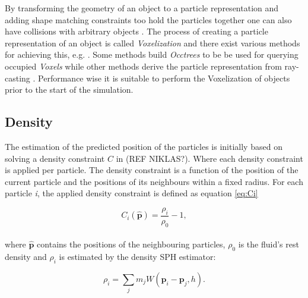By transforming the geometry of an object to a particle representation and adding shape matching constraints too hold the particles together one can also have collisions with arbitrary objects \cite{muller2005meshless, macklin2014unified}. The process of creating a particle representation of an object is called \textit{Voxelization} and there exist various methods for achieving this, e.g. \cite{VoxPolygon, VoxSingle}. Some methods build \textit{Occtrees} to be be used for querying occupied \textit{Voxels} while other methods derive the particle representation from ray-casting \cite{VoxSingle}. Performance wise it is suitable to perform the Voxelization of objects prior to the start of the simulation.


\subsection{Density}

The estimation of the predicted position of the particles is initially based on solving a density constraint $C$ in (REF NIKLAS?). Where each density constraint is applied per particle. The density constraint is a function of the position of the current particle and the positions of its neighbours within a fixed radius. For each particle \textit{i}, the applied density constraint is defined as equation \ref{eq:Ci}

\begin{equation}
\label{eq:Ci}
C_i(\hat{\mathbf{p}}) = \frac{\rho_i}{\rho_0} - 1,
\end{equation}
\\
where $\hat{\mathbf{p}}$ contains the positions of the neighbouring particles, $\rho_0$ is the fluid's rest density and $\rho_i$ is estimated by the density SPH estimator:

\begin{equation}
\label{eq:Rhoi}
\rho_i = \sum\limits_{j} m_j W(\mathbf{p}_i - \mathbf{p}_j, h).
\end{equation}

